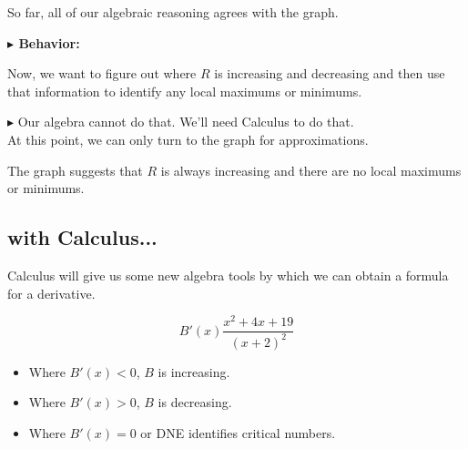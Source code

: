 \documentclass{ximera}
\begin{document}
\begin{exercise}
So far, all of our algebraic reasoning agrees with the graph.




\begin{center}
\end{center}










\textbf{\textcolor{blue!55!black}{$\blacktriangleright$ Behavior: }}  




Now, we want to figure out where $R$ is increasing and decreasing and then use that information to identify any local maximums or minimums.



\textbf{\textcolor{red!90!darkgray}{$\blacktriangleright$}} Our algebra cannot do that. We'll need Calculus to do that. \\










At this point, we can only turn to the graph for approximations.




The graph suggests that $R$ is always increasing and there are no local maximums or minimums.





\subsection*{with Calculus...}



Calculus will give us some new algebra tools by which we can obtain a formula for a derivative.



\[
B'(x) \frac{x^2 + 4x + 19}{(x+2)^2}
\]



\begin{itemize}
\item Where $B'(x) < 0$, $B$ is increasing.
\item Where $B'(x) > 0$, $B$ is decreasing.
\item Where $B'(x) = 0$ or DNE identifies critical numbers.
\end{itemize}






\end{exercise}
\end{document}
